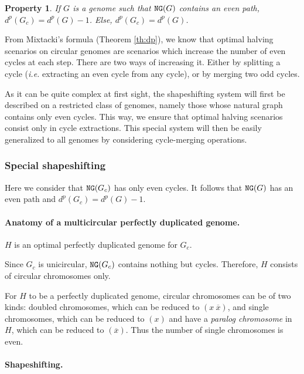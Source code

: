 \documentclass[11pt,final,twoside,nofrench]{thlifl}
\newcommand{\snd}[1]{ \ensuremath{\overline{#1}} }
\renewcommand{\NG}{\ensuremath{\mbox{\texttt{NG}}}}
\newtheorem{property}{Property}
\begin{document}
\begin{property}
\label{prop:dpgc}
If $G$ is a genome such that $\NG(G)$ contains an even path, $d^p(G_c) = d^p(G) - 1$. Else, $d^p(G_c) = d^p(G)$. 
\end{property}

From Mixtacki's formula (Theorem \ref{th:dp}), we know that optimal halving scenarios on circular genomes are scenarios which increase the number of even cycles at each step.
There are two ways of increasing it. Either by splitting a cycle (\textit{i.e.} extracting an even cycle from any cycle), or by merging two odd cycles.

As it can be quite complex at first sight, the shapeshifting system will first be described on a restricted class of genomes, namely those whose natural graph contains only even cycles. This way, we ensure that optimal halving scenarios consist only in cycle extractions.
This special system will then be easily generalized to all genomes by considering cycle-merging operations.

\subsubsection{Special shapeshifting}

Here we consider that $\NG(G_c)$ has only even cycles.
It follows that $\NG(G)$ has an even path and $d^p(G_c) = d^p(G) - 1$.

\paragraph{Anatomy of a multicircular perfectly duplicated genome.}

$H$ is an optimal perfectly duplicated genome for $G_c$.

Since $G_c$ is unicircular, $\NG(G_c)$ contains nothing but cycles.
Therefore, $H$ consists of circular chromosomes only.

For $H$ to be a perfectly duplicated genome, circular chromosomes can
be of two kinds: doubled chromosomes, which can be reduced to
$(x~\snd{x})$, and single chromosomes, which can be reduced to $(x)$
and have a \emph{paralog chromosome} in $H$, which can be reduced to
$(\snd{x})$. Thus the number of single chromosomes is even.

\paragraph{Shapeshifting.}
\end{document}
